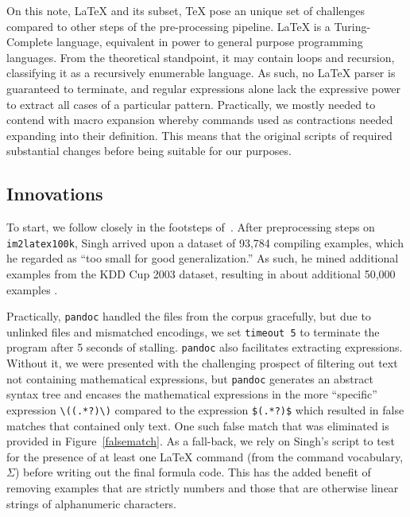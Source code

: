 \documentclass[12pt]{article}
\begin{document}
On this note, \LaTeX{} and its subset, \TeX{} pose an unique set of challenges
compared to other steps of the pre-processing pipeline. \LaTeX{} is a
Turing-Complete language, equivalent in power to general purpose programming
languages. From the theoretical standpoint, it may contain loops and recursion,
classifying it as a recursively enumerable language. As such, no \LaTeX{} parser
is guaranteed to terminate, and regular expressions alone lack the expressive
power to extract all cases of a particular pattern. Practically, we mostly
needed to contend with macro expansion whereby commands used as contractions
needed expanding into their definition. This means that the original scripts of
\cite{deng2016you} required substantial changes before being suitable for our
purposes.

\subsection{Innovations}
\label{datainnov}

To start, we follow closely in the footsteps of~\citeauthor{singh2018teaching}. After
preprocessing steps on \texttt{im2latex100k}, Singh arrived upon a dataset of
93,784 compiling examples, which he regarded as ``too small for good
generalization.'' As such, he mined additional examples from the KDD Cup 2003
dataset, resulting in about additional 50,000 examples
\parencite[8]{singh2018teaching}.  %

Practically, \texttt{pandoc} handled the files from the corpus gracefully, but
due to unlinked files and mismatched encodings, we set \texttt{timeout 5} to
terminate the program after 5 seconds of stalling. \texttt{pandoc} also
facilitates extracting expressions. Without it, we were presented with the
challenging prospect of filtering out text not containing mathematical
expressions, but \texttt{pandoc} generates an abstract syntax tree and encases
the mathematical expressions in the more ``specific'' expression
\verb|\((.*?)\)| compared to the expression \texttt{\$(.*?)\$} which resulted in
false matches that contained only text. One such false match that was eliminated
is provided in Figure~\ref{falsematch}. As a fall-back, we rely on Singh's script to test
for the presence of at least one \LaTeX{} command (from the command vocabulary,
$\Sigma$) before writing out the final formula code. This has the added benefit
of removing examples that are strictly numbers and those that are otherwise
linear strings of alphanumeric characters.
\end{document}
